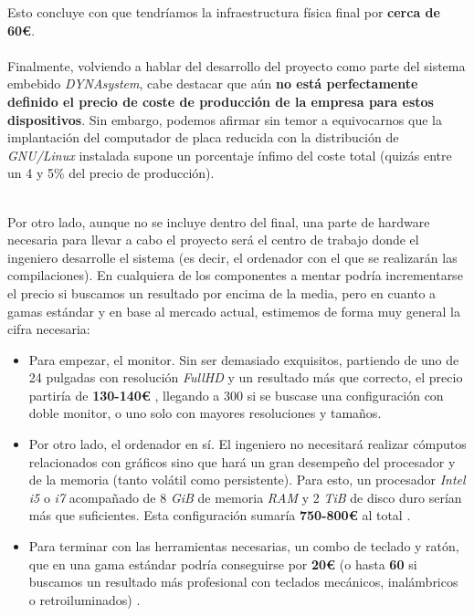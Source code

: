 Esto concluye con que tendríamos la infraestructura física final por \textbf{cerca de 60€}.\\

\noindent\makebox[\linewidth]{\rule{\textwidth}{0.4pt}}\\

Finalmente, volviendo a hablar del desarrollo del proyecto como parte del sistema embebido \textit{DYNAsystem}, cabe destacar que aún \textbf{no está perfectamente definido el precio de coste de producción de la empresa para estos dispositivos}. Sin embargo, podemos afirmar sin temor a equivocarnos que la implantación del computador de placa reducida con la distribución de \textit{GNU/Linux} instalada supone un porcentaje ínfimo del coste total (quizás entre un 4 y 5\% del precio de producción).

\noindent\makebox[\linewidth]{\rule{\textwidth}{0.4pt}}\\

Por otro lado, aunque no se incluye dentro del final, una parte de hardware necesaria para llevar a cabo el proyecto será el centro de trabajo donde el ingeniero desarrolle el sistema (es decir, el ordenador con el que se realizarán las compilaciones). En cualquiera de los componentes a mentar podría incrementarse el precio si buscamos un resultado por encima de la media, pero en cuanto a gamas estándar y en base al mercado actual, estimemos de forma muy general la cifra necesaria:

\begin{itemize}
	\item Para empezar, el monitor. Sin ser demasiado exquisitos, partiendo de uno de 24 pulgadas con resolución \textit{FullHD} y un resultado más que correcto, el precio partiría de \textbf{130-140€} \cite{monitor-samsung-pccom}, llegando a 300 si se buscase una configuración con doble monitor, o uno solo con mayores resoluciones y tamaños.
	\item Por otro lado, el ordenador en sí. El ingeniero no necesitará realizar cómputos relacionados con gráficos sino que hará un gran desempeño del procesador y de la memoria (tanto volátil como persistente). Para esto, un procesador \textit{Intel} \textit{i5} o \textit{i7} acompañado de 8 \textit{GiB} de memoria \textit{RAM} y 2 \textit{TiB} de disco duro serían más que suficientes. Esta configuración sumaría \textbf{750-800€} al total \cite{ordenador-sobremesa-pccom}.
	\item Para terminar con las herramientas necesarias, un combo de teclado y ratón, que en una gama estándar podría conseguirse por \textbf{20€} (o hasta \textbf{60} si buscamos un resultado más profesional con teclados mecánicos, inalámbricos o retroiluminados) \cite{combo-teclado-logitech-pccom}.
\end{itemize}


